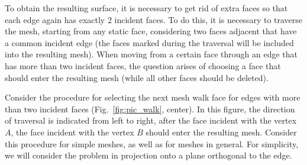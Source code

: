 To obtain the resulting surface, it is necessary to get rid of extra faces so that each edge again has exactly 2 incident faces.
To do this, it is necessary to traverse the mesh, starting from any static face, considering two faces adjacent that have a common incident edge (the faces marked during the traversal will be included into the resulting mesh).
When moving from a certain face through an edge that has more than two incident faces, the question arises of choosing a face that should enter the resulting mesh (while all other faces should be deleted).

Consider the procedure for selecting the next mesh walk face for edges with more than two incident faces (Fig.~\ref{fig:pic_walk}, center).
In this figure, the direction of traversal is indicated from left to right, after the face incident with the vertex $A$, the face incident with the vertex $B$ should enter the resulting mesh.
Consider this procedure for simple meshes, as well as for meshes in general.
For simplicity, we will consider the problem in projection onto a plane orthogonal to the edge.

